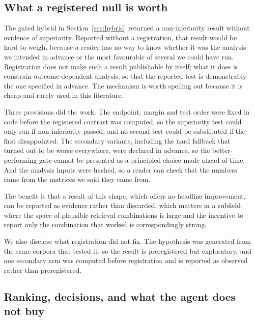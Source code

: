 \documentclass[a4paper,fleqn]{cas-sc}
\begin{document}
\subsection{What a registered null is worth}

The gated hybrid in Section~\ref{sec:hybrid} returned a non-inferiority result without evidence of superiority. Reported without a registration, that result would be hard to weigh, because a reader has no way to know whether it was the analysis we intended in advance or the most favourable of several we could have run. Registration does not make such a result publishable by itself; what it does is constrain outcome-dependent analysis, so that the reported test is demonstrably the one specified in advance. The mechanism is worth spelling out because it is cheap and rarely used in this literature.

Three provisions did the work. The endpoint, margin and test order were fixed in code before the registered contrast was computed, so the superiority test could only run if non-inferiority passed, and no second test could be substituted if the first disappointed. The secondary variants, including the hard fallback that turned out to be worse everywhere, were declared in advance, so the better-performing gate cannot be presented as a principled choice made ahead of time. And the analysis inputs were hashed, so a reader can check that the numbers came from the matrices we said they came from.

The benefit is that a result of this shape, which offers no headline improvement, can be reported as evidence rather than discarded, which matters in a subfield where the space of plausible retrieval combinations is large and the incentive to report only the combination that worked is correspondingly strong.

We also disclose what registration did not fix. The hypothesis was generated from the same corpora that tested it, so the result is preregistered but exploratory, and one secondary arm was computed before registration and is reported as observed rather than preregistered.

\subsection{Ranking, decisions, and what the agent does not buy}
\end{document}
